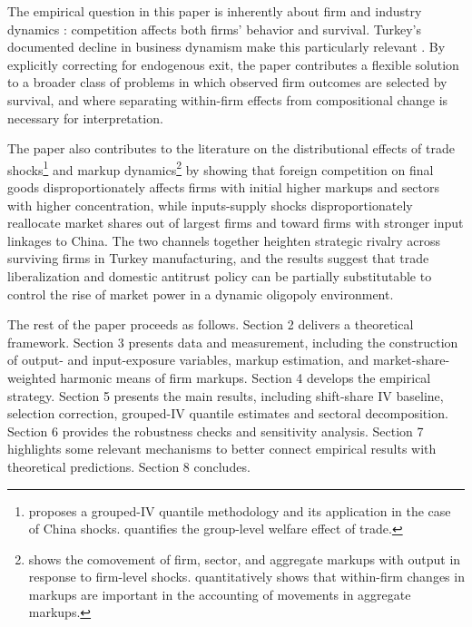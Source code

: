 \documentclass[12pt]{article}
\begin{document}
The empirical question in this paper is inherently about firm and industry dynamics \parencite{melitzImpactTradeIntraIndustry2003,ericsonMarkovPerfectIndustryDynamics1995,hopenhaynEntryExitFirm1992}: competition affects both firms' behavior and survival. Turkey's documented decline in business dynamism make this particularly relevant \parencite{akcigitFactsBusinessDynamism2020}. By explicitly correcting for endogenous exit, the paper contributes a flexible solution to a broader class of problems in which observed firm outcomes are selected by survival, and where separating within-firm effects from compositional change is necessary for interpretation. 

The paper also contributes to the literature on the distributional effects of trade shocks\footnote{\textcite{chetverikovIVQuantileRegression2016} proposes a grouped-IV quantile methodology and its application in the case of China shocks. \textcite{galleSlicingPieQuantifying2023} quantifies the group-level welfare effect of trade.} and markup dynamics\footnote{\textcite{bursteinBottomUpMarkupFluctuations2025} shows the comovement of firm, sector, and aggregate markups with output in response to firm-level shocks. \textcite{baqaeeProductivityMisallocationGeneral2020} quantitatively shows that within-firm changes in markups are important in the accounting of movements in aggregate markups.} by showing that foreign competition on final goods disproportionately affects firms with initial higher markups and sectors with higher concentration, while inputs-supply shocks disproportionately reallocate market shares out of largest firms and toward firms with stronger input linkages to China. The two channels together heighten strategic rivalry across surviving firms in Turkey manufacturing, and the results suggest that trade liberalization and domestic antitrust policy can be partially substitutable to control the rise of market power in a dynamic oligopoly environment.

The rest of the paper proceeds as follows. Section 2 delivers a theoretical framework. Section 3 presents data and measurement, including the construction of output- and input-exposure variables, markup estimation, and market-share-weighted harmonic means of firm markups. Section 4 develops the empirical strategy. Section 5 presents the main results, including shift-share IV baseline, selection correction, grouped-IV quantile estimates and sectoral decomposition. Section 6 provides the robustness checks and sensitivity analysis. Section 7 highlights some relevant mechanisms to better connect empirical results with theoretical predictions. Section 8 concludes.
\end{document}
